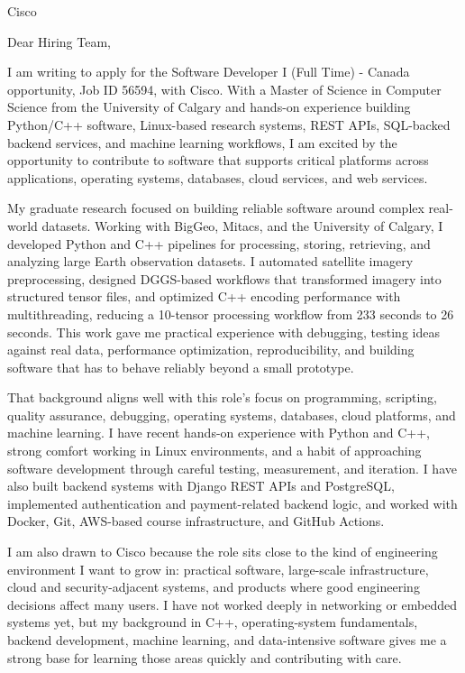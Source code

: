 \documentclass[11pt]{letter}
\begin{document}
\begin{letter}{Cisco}

\opening{Dear Hiring Team,}

I am writing to apply for the Software Developer I (Full Time) - Canada opportunity, Job ID 56594, with Cisco. With a Master of Science in Computer Science from the University of Calgary and hands-on experience building Python/C++ software, Linux-based research systems, REST APIs, SQL-backed backend services, and machine learning workflows, I am excited by the opportunity to contribute to software that supports critical platforms across applications, operating systems, databases, cloud services, and web services.

My graduate research focused on building reliable software around complex real-world datasets. Working with BigGeo, Mitacs, and the University of Calgary, I developed Python and C++ pipelines for processing, storing, retrieving, and analyzing large Earth observation datasets. I automated satellite imagery preprocessing, designed DGGS-based workflows that transformed imagery into structured tensor files, and optimized C++ encoding performance with multithreading, reducing a 10-tensor processing workflow from 233 seconds to 26 seconds. This work gave me practical experience with debugging, testing ideas against real data, performance optimization, reproducibility, and building software that has to behave reliably beyond a small prototype.

That background aligns well with this role's focus on programming, scripting, quality assurance, debugging, operating systems, databases, cloud platforms, and machine learning. I have recent hands-on experience with Python and C++, strong comfort working in Linux environments, and a habit of approaching software development through careful testing, measurement, and iteration. I have also built backend systems with Django REST APIs and PostgreSQL, implemented authentication and payment-related backend logic, and worked with Docker, Git, AWS-based course infrastructure, and GitHub Actions.

I am also drawn to Cisco because the role sits close to the kind of engineering environment I want to grow in: practical software, large-scale infrastructure, cloud and security-adjacent systems, and products where good engineering decisions affect many users. I have not worked deeply in networking or embedded systems yet, but my background in C++, operating-system fundamentals, backend development, machine learning, and data-intensive software gives me a strong base for learning those areas quickly and contributing with care.


\end{letter}
\end{document}
